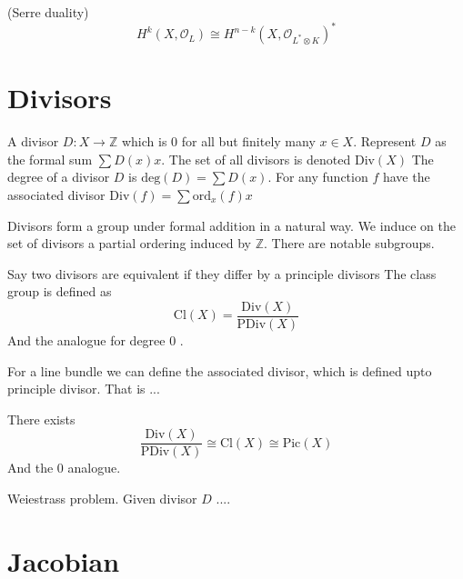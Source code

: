 \begin{theorem}
    (Serre duality) 
    \begin{equation}
        H^k ( X, \mathcal{O}_L ) \cong H^{n-k} (X, \mathcal{O}_{L ^* \otimes K}) ^* 
    \end{equation}
\end{theorem}



\section{Divisors} %

\begin{definition}
    A divisor $D : X \rightarrow \mathbb{Z} $ which is 0 for all but finitely many $x \in X$. 
    Represent $D$ as the formal sum $ \sum D(x) x $. 
    The set of all divisors is denoted $ \mathrm{Div}(X)$
    The degree of a divisor $D$ is $\mathrm{deg}(D)  = \sum D(x) $. 
    For any function $f$ have the associated divisor $ \mathrm{Div}(f) = \sum \mathrm{ord}_x(f) x $  
\end{definition}

Divisors form a group under formal addition in a natural way. 
We induce on the set of divisors a partial ordering induced by $\mathbb{Z} $. 
There are notable subgroups.

Say two divisors are equivalent if they differ by a principle divisors 
The class group is defined as 
\begin{equation}
    \mathrm{Cl} ( X) = \frac{\mathrm{Div }(X)}{\mathrm{PDiv}(X) }  
\end{equation}
And the analogue for degree 0 .

For a line bundle we can define the associated divisor, which is defined upto principle divisor. 
That is ...
\begin{theorem}
 There exists 
    \begin{equation}
        \frac{\mathrm{Div}(X) }{\mathrm{PDiv}(X) }  \cong \mathrm{Cl}(X) \cong \mathrm{Pic}(X) 
    \end{equation}
    And the $0 $ analogue. 
\end{theorem}

Weiestrass problem. 
Given divisor $ D$ ....

\section{Jacobian} %

